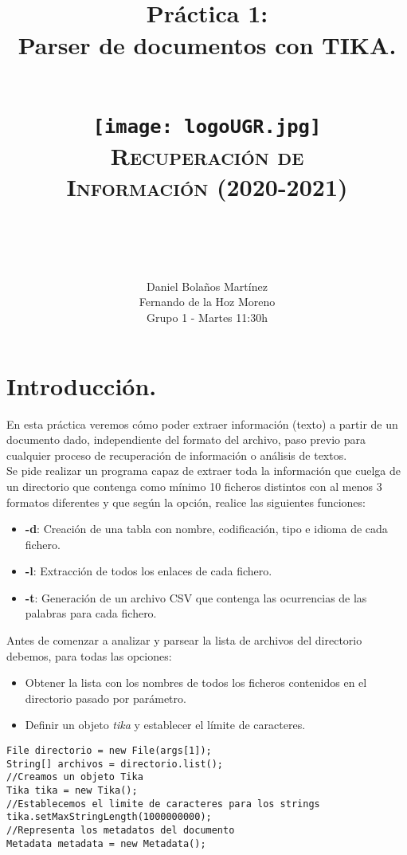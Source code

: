 \documentclass[12pt]{article}
\title{
\normalfont \normalsize
\horrule{0.5pt} \\[0.4cm]
\huge Práctica 1: \\ Parser de documentos con TIKA. \\
\horrule{2pt} \\[0.5cm]
\begin{figure}[h]
\centering
\texttt{[image: logoUGR.jpg]}
\textsc{\textbf{Recuperación de Información (2020-2021)}} \\ [10pt]
\end{figure}\
}
\author{ Daniel Bolaños Martínez \\ Fernando de la Hoz Moreno \\ Grupo 1 - Martes 11:30h}
\date{}
\begin{document}
\maketitle

\newpage

\tableofcontents

\clearpage

\section{Introducción.}

En esta práctica veremos cómo poder extraer información (texto) a partir de un documento dado, independiente del formato del archivo, paso previo para cualquier proceso de recuperación de información o análisis de textos.\cite{Guion}\\

Se pide realizar un programa capaz de extraer toda la información que cuelga de un directorio que contenga como mínimo 10 ficheros distintos con al menos 3 formatos diferentes y que según la opción, realice las siguientes funciones:

\begin{itemize}
\item \textbf{-d}: Creación de una tabla con nombre, codificación, tipo e idioma de cada fichero.
\item \textbf{-l}: Extracción de todos los enlaces de cada fichero.
\item \textbf{-t}: Generación de un archivo CSV que contenga las ocurrencias de las palabras para cada fichero.
\end{itemize}

Antes de comenzar a analizar y parsear la lista de archivos del directorio debemos, para todas las opciones:

\begin{itemize}
\item Obtener la lista con los nombres de todos los ficheros contenidos en el directorio pasado por parámetro.
\item Definir un objeto \textit{tika} y establecer el límite de caracteres.
\end{itemize}

\begin{lstlisting}
File directorio = new File(args[1]);
String[] archivos = directorio.list();
//Creamos un objeto Tika
Tika tika = new Tika();
//Establecemos el limite de caracteres para los strings
tika.setMaxStringLength(1000000000);
//Representa los metadatos del documento
Metadata metadata = new Metadata();
\end{lstlisting}\
\end{document}
